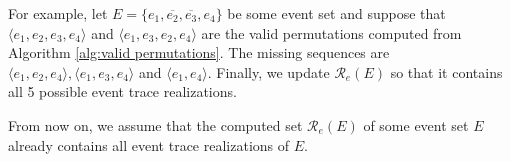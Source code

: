 For example, let $E=\{e_1,\overline{e_2},\overline{e_3},e_4\}$ be some event set and suppose that $\langle e_1,e_2,e_3,e_4 \rangle$ and $\langle e_1,e_3,e_2,e_4 \rangle$ are the valid permutations computed from Algorithm \ref{alg:valid permutations}.
The missing sequences are $\langle e_1, e_2, e_4 \rangle, \langle e_1, e_3, e_4 \rangle$ and $\langle e_1, e_4 \rangle$.
Finally, we update $\mathcal{R}_e(E)$ so that it contains all 5 possible event trace realizations.

From now on, we assume that the computed set $\mathcal{R}_e(E)$ of some event set $E$ already contains all event trace realizations of $E$.
%
%
%
%
%
%
%
